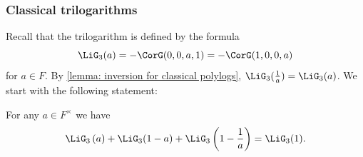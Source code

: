 \documentclass[a4paper]{amsart}
\begin{document}
\subsubsection{Classical trilogarithms} \label{section: trilog} Recall that the trilogarithm is defined by the formula 
\[\LiG_3(a)=-\CorG(0,0,a,1) = -\CorG(1,0,0,a)\] 
for $a\in F$. By \cref{lemma: inversion for classical polylogs}, $\LiG_3(\frac{1}{a})=\LiG_3(a)$.  We start with the following statement:
\begin{lemma}\label{lem 3-term relation}
    For any $a\in F^{\times}$ we have
    \begin{equation}
    \LiG_3\left(a\right)+\LiG_3(1-a)+\LiG_3\left(1-\frac{1}{a}\right)=\LiG_3(1)\label{EqTrilog2}.
    \end{equation}
\end{lemma}
\end{document}
